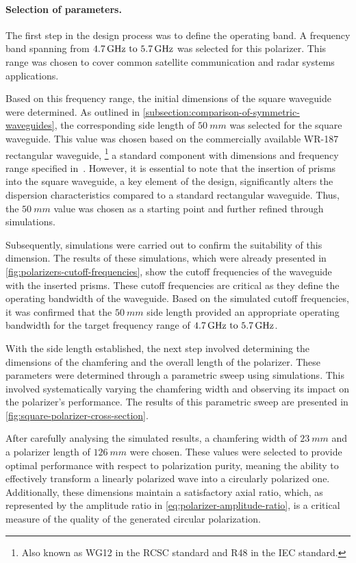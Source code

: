 \documentclass[11pt,a4paper,twoside,openany]{report}
\begin{document}
\paragraph{Selection of parameters.} The first step in the design process was to define the operating band. A frequency band spanning from $\frequencyrange$ was selected for this polarizer. This range was chosen to cover common satellite communication and radar systems applications.

Based on this frequency range, the initial dimensions of the square waveguide were determined. As outlined in \cref{subsection:comparison-of-symmetric-waveguides}, the corresponding side length of $\qty{50}{mm}$ was selected for the square waveguide. This value was chosen based on the commercially available WR-187 rectangular waveguide,
    \footnote{Also known as WG12 in the RCSC standard and R48 in the IEC standard.}
a standard component with dimensions and frequency range specified in~\parencite{spinner:waveguide-specifications}. However, it is essential to note that the insertion of prisms into the square waveguide, a key element of the design, significantly alters the dispersion characteristics compared to a standard rectangular waveguide. Thus, the $\qty{50}{mm}$ value was chosen as a starting point and further refined through simulations.

Subsequently, simulations were carried out to confirm the suitability of this dimension. The results of these simulations, which were already presented in \cref{fig:polarizers-cutoff-frequencies}, show the cutoff frequencies of the waveguide with the inserted prisms. These cutoff frequencies are critical as they define the operating bandwidth of the waveguide. Based on the simulated cutoff frequencies, it was confirmed that the $\qty{50}{mm}$ side length provided an appropriate operating bandwidth for the target frequency range of $\frequencyrange$.

With the side length established, the next step involved determining the dimensions of the chamfering and the overall length of the polarizer. These parameters were determined through a parametric sweep using simulations. This involved systematically varying the chamfering width and observing its impact on the polarizer's performance. The results of this parametric sweep are presented in \cref{fig:square-polarizer-cross-section}.

After carefully analysing the simulated results, a chamfering width of $\qty{23}{mm}$ and a polarizer length of $\qty{126}{mm}$ were chosen. These values were selected to provide optimal performance with respect to polarization purity, meaning the ability to effectively transform a linearly polarized wave into a circularly polarized one. Additionally, these dimensions maintain a satisfactory axial ratio, which, as represented by the amplitude ratio in \cref{eq:polarizer-amplitude-ratio}, is a critical measure of the quality of the generated circular polarization.
\end{document}
